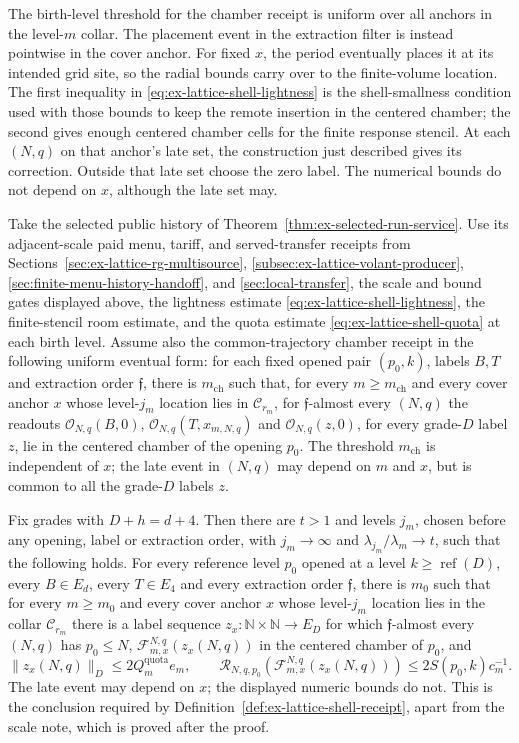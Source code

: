 The birth-level threshold for the chamber receipt is uniform over all
anchors in the level-$m$ collar. The placement event in the extraction
filter is instead pointwise in the cover anchor. For fixed $x$, the period
eventually places it at its intended grid site, so the radial bounds carry
over to the finite-volume location. The first inequality in
\eqref{eq:ex-lattice-shell-lightness} is the shell-smallness condition
used with those bounds to keep the remote insertion in the centered
chamber; the second gives enough centered chamber cells for the finite
response stencil. At each $(N,q)$ on that anchor's
late set, the construction just described gives its correction. Outside
that late set choose the zero label. The numerical bounds do not depend on
$x$, although the late set may.

\begin{proposition}
\label{prop:ex-lattice-actual-shell-node}
Take the selected public history of Theorem~\ref{thm:ex-selected-run-service}.
Use its adjacent-scale paid menu, tariff, and served-transfer receipts from
Sections~\ref{sec:ex-lattice-rg-multisource},
\ref{subsec:ex-lattice-volant-producer},
\ref{sec:finite-menu-history-handoff}, and \ref{sec:local-transfer}, the
scale and bound gates displayed above, the lightness estimate
\eqref{eq:ex-lattice-shell-lightness}, the finite-stencil room estimate,
and the quota estimate \eqref{eq:ex-lattice-shell-quota} at each birth
level.  Assume also the common-trajectory chamber receipt in the following
uniform eventual form: for each fixed opened pair $(p_0,k)$, labels $B,T$
and extraction order $\mathfrak f$, there is $m_{\mathrm{ch}}$ such that,
for every $m\ge m_{\mathrm{ch}}$ and every cover anchor $x$ whose
level-$j_m$ location lies in $\mathcal C_{r_m}$, for
$\mathfrak f$-almost every $(N,q)$ the readouts
$\mathcal O_{N,q}(B,0)$, $\mathcal O_{N,q}(T,x_{m,N,q})$ and
$\mathcal O_{N,q}(z,0)$, for every grade-$D$ label $z$, lie in the centered
chamber of the opening $p_0$. The threshold $m_{\mathrm{ch}}$ is
independent of $x$; the late event in $(N,q)$ may depend on $m$ and $x$,
but is common to all the grade-$D$ labels $z$.

Fix grades with $D+h=d+4$.  Then there are $t>1$ and levels $j_m$, chosen
before any opening, label or extraction order, with $j_m\to\infty$ and
$\lambda_{j_m}/\lambda_m\to t$, such that the following holds.  For every
reference level $p_0$ opened at a level $k\ge\operatorname{ref}(D)$, every
$B\in E_d$, every $T\in E_4$ and every extraction order $\mathfrak f$,
there is $m_0$ such that for every $m\ge m_0$ and every cover anchor $x$
whose level-$j_m$ location lies in the collar $\mathcal C_{r_m}$ there is a
label sequence $z_x:\mathbb N\times\mathbb N\to E_D$ for which
$\mathfrak f$-almost every $(N,q)$ has $p_0\le N$,
$\mathcal F_{m,x}^{N,q}(z_x(N,q))$ in the centered chamber of $p_0$, and
\[
 \|z_x(N,q)\|_D\le2Q_m^{\mathrm{quota}}e_m,
 \qquad \mathcal R_{N,q,p_0}(\mathcal F_{m,x}^{N,q}(z_x(N,q)))
       \le2S(p_0,k)c_m^{-1}.
\]
The late event may depend on $x$; the displayed numeric bounds do not.
This is the conclusion required by
Definition~\ref{def:ex-lattice-shell-receipt}, apart from the scale note,
which is proved after the proof.
\end{proposition}

